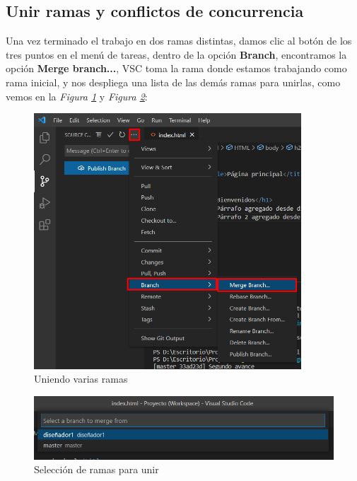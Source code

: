 \subsection{Unir ramas y conflictos de concurrencia}
\hspace{0.55cm}Una vez terminado el trabajo en dos ramas distintas, damos clic al botón de los tres puntos en el menú de tareas, dentro de la opción \textbf{Branch}, encontramos la opción \textbf{Merge branch...}, VSC toma la rama donde estamos trabajando como rama inicial, y nos despliega una lista de las demás ramas para unirlas, como vemos en la \textit{Figura \ref{fig: 23}} y \textit{Figura \ref{fig: 24}}:
\begin{figure}[H]
    \centering
    \caption{Uniendo varias ramas}
    \label{fig: 23}
    \includegraphics[width=10cm]{capturas/merge1.png}
\end{figure}
\begin{figure}[H]
    \centering
    \caption{Selección de ramas para unir}
    \label{fig: 24}
    \includegraphics[width=\textwidth]{capturas/merge2.png}
\end{figure}

